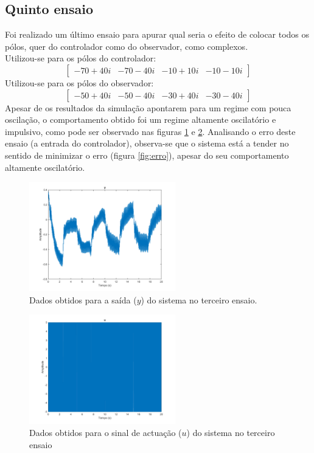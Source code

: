 \documentclass[%
  reprint,
  nofootinbib,
  amsmath,amssymb,
  aps,
  10pt,
  a4paper
]{revtex4-1}
\begin{document}
\subsection{Quinto ensaio}
Foi realizado um último ensaio para apurar qual seria o efeito de colocar todos os pólos, quer do controlador como do observador, como complexos.\\
Utilizou-se para os pólos do controlador:
\begin{equation}
\begin{bmatrix}
-70+40i & -70-40i & -10+10i &-10-10i
\end{bmatrix}
\end{equation}
Utilizou-se para os pólos do observador:
\begin{equation}
\begin{bmatrix}
-50+40i & -50-40i & -30+40i &-30-40i
\end{bmatrix}
\end{equation}
Apesar de os resultados da simulação apontarem para um regime com pouca oscilação, o comportamento obtido foi um regime altamente oscilatório e impulsivo, como pode ser observado nas figuras \ref{fig:y_g} e \ref{fig:u_g}.
Analisando o erro deste ensaio (a entrada do controlador), observa-se que o sistema está a tender no sentido de minimizar o erro (figura \ref{fig:erro}), apesar do seu comportamento altamente oscilatório.
\begin{figure}[H]
\includegraphics[width=2.5in]{../imgs/dados_00_g/dados_00_g_y.png}
\caption{Dados obtidos para a saída ($y$) do sistema no terceiro ensaio.}
\label{fig:y_g}
\end{figure}
\begin{figure}[H]
\includegraphics[width=2.5in]{../imgs/dados_00_g/dados_00_g_u.png}
\caption{Dados obtidos para o sinal de actuação ($u$) do sistema no terceiro ensaio}
\label{fig:u_g}
\end{figure}
\end{document}
